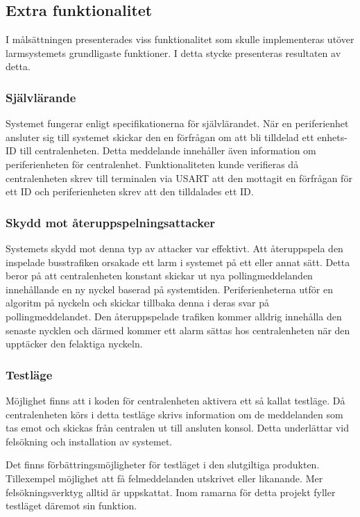 \documentclass[a4paper]{article}
\begin{document}
\subsection{Extra funktionalitet}
I målsättningen presenterades viss funktionalitet som skulle implementeras utöver larmsystemets grundligaste funktioner.
I detta stycke presenteras resultaten av detta.

\subsubsection{Självlärande}
Systemet fungerar enligt specifikationerna för självlärandet.
När en periferienhet ansluter sig till systemet skickar den en förfrågan om att bli tilldelad ett enhets-ID till centralenheten.
Detta meddelande innehåller även information om periferienheten för centralenhet.
Funktionaliteten kunde verifieras då centralenheten skrev till terminalen via USART att den mottagit en förfrågan för ett ID och periferienheten skrev att den tilldalades ett ID.

\subsubsection{Skydd mot återuppspelningsattacker}
Systemets skydd mot denna typ av attacker var effektivt.
Att återuppspela den inspelade busstrafiken orsakade ett larm i systemet på ett eller annat sätt.
Detta beror på att centralenheten konstant skickar ut nya pollingmeddelanden innehållande en ny nyckel baserad på systemtiden.
Periferienheterna utför en algoritm på nyckeln och skickar tillbaka denna i deras svar på pollingmeddelandet.
Den återuppspelade trafiken kommer alldrig innehålla den senaste nycklen och därmed kommer ett alarm sättas hos centralenheten när den upptäcker den felaktiga nyckeln.

\subsubsection{Testläge}
Möjlighet finns att i koden för centralenheten aktivera ett så kallat testläge.
Då centralenheten körs i detta testläge skrivs information om de meddelanden som tas emot och skickas från centralen ut till ansluten konsol.
Detta underlättar vid felsökning och installation av systemet.

Det finns förbättringsmöjligheter för testläget i den slutgiltiga produkten.
Tillexempel möjlighet att få felmeddelanden utskrivet eller likanande.
Mer felsökningsverktyg alltid är uppskattat.
Inom ramarna för detta projekt fyller testläget däremot sin funktion.
\end{document}
